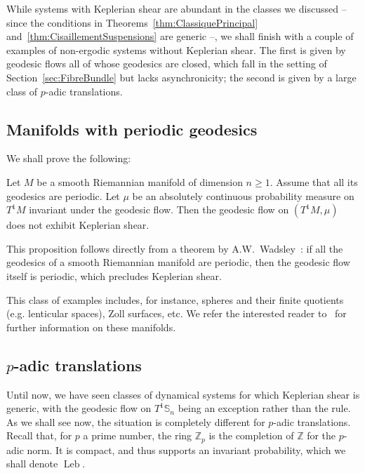 \documentclass[10pt]{amsart}
\theoremstyle{definition}\newtheorem{defi}[theo]{Definition}\newtheorem{rema}[theo]{Remark}\newtheorem{exam}[theo]{Example}\newtheorem{exem}[theo]{Example}\newtheorem{nota}[theo]{Notation}
\DeclareMathOperator{\Leb}{Leb}
\newcommand{\Z}{\mathbb{Z}}
\newcommand{\Sbb}{\mathbb{S}}
\begin{document}
While systems with Keplerian shear are abundant in the classes we discussed -- since the conditions in Theorems~\ref{thm:ClassiquePrincipal} and~\ref{thm:CisaillementSuspensions} are generic --, we shall finish with a couple of examples of non-ergodic systems without Keplerian shear. The first is given by geodesic flows all of whose geodesics are closed, which fall in the setting of Section~\ref{sec:FibreBundle} but lacks asynchronicity; the second is given by a large class of $p$-adic translations.


\subsection{Manifolds with periodic geodesics}\label{subsec:FlotTS}

We shall prove the following:


\begin{prop}
Let $M$ be a smooth Riemannian manifold of dimension $n \geq 1$. Assume that all its geodesics are periodic. Let $\mu$ be an absolutely continuous probability measure on $T^1 M$ invariant under the geodesic flow. Then the geodesic flow on $(T^1 M, \mu)$ does not exhibit Keplerian shear.
\end{prop}


This proposition follows directly from a theorem by A.W.~Wadsley~\cite{Wadsley:1975}: if all the geodesics of a smooth Riemannian manifold are periodic, then the geodesic flow itself is periodic, which precludes Keplerian shear.


This class of examples includes, for instance, spheres and their finite quotients (e.g. lenticular spaces), Zoll surfaces, etc. We refer the interested reader to~\cite[Chapter~7]{Besse:1978} for further information on these manifolds.



\subsection{\texorpdfstring{$p$}{p}-adic translations}\label{subsec:PAdique}

Until now, we have seen classes of dynamical systems for which Keplerian shear is generic, with the geodesic flow on $T^1 \Sbb_n$ being an exception rather than the rule. As we shall see now, the situation is completely different for $p$-adic translations. Recall that, for $p$ a prime number, the ring $\Z_p$ is the completion of $\Z$ for the $p$-adic norm. It is compact, and thus supports an invariant probability, which we shall denote $\Leb$.
\end{document}
